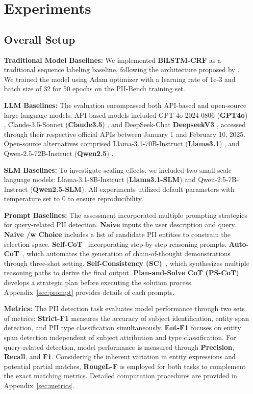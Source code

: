 \section{Experiments}
\subsection{Overall Setup}
\noindent\textbf{Traditional Model Baselines:}
We implemented \textbf{BiLSTM-CRF} as a traditional sequence labeling baseline, following the architecture proposed by \citet{huang2015bidirectional}. We trained the model using Adam optimizer with a learning rate of 1e-3 and batch size of 32 for 50 epochs on the PII-Bench training set.

\noindent\textbf{LLM Baselines:}
The evaluation encompassed both API-based and open-source large language models.
API-based models included GPT-4o-2024-0806 (\textbf{GPT4o}) \citep{gpt-4o}, Claude-3.5-Sonnet (\textbf{Claude3.5}) \citep{claude}, and DeepSeek-Chat {\textbf{DeepseekV3}} \citep{deepseek}, accessed through their respective official APIs between January 1 and February 10, 2025.
Open-source alternatives comprised Llama-3.1-70B-Instruct (\textbf{Llama3.1}) \citep{dubey2024llama}, and Qwen-2.5-72B-Instruct (\textbf{Qwen2.5}) \citep{qwen25}.

\noindent\textbf{SLM Baselines:}
To investigate scaling effects, we included two small-scale language models: Llama-3.1-8B-Instruct (\textbf{Llama3.1-SLM}) and Qwen-2.5-7B-Instruct (\textbf{Qwen2.5-SLM}).
All experiments utilized default parameters with temperature set to 0 to ensure reproducibility.


\noindent\textbf{Prompt Baselines:}
The assessment incorporated multiple prompting strategies for query-related PII detection. \textbf{Naive} inputs the user description and query. 
\textbf{Naive /w Choice} includes a list of candidate PII entities to constrain the selection space.
\textbf{Self-CoT}~\citep{wei2022chain} incorporating step-by-step reasoning prompts. 
\textbf{Auto-CoT}~\cite{autocot}, which automates the generation of chain-of-thought demonstrations through three-shot setting. 
\textbf{Self-Consistency (SC)}~\cite{sc}, which  synthesizes multiple reasoning paths to derive the final output. 
\textbf{Plan-and-Solve CoT (PS-CoT})~\cite{wang2023plan} develops a strategic plan before executing the solution process. 
Appendix~\ref{sec:prompt} provides details of each prompts.

\noindent\textbf{Metrics:}
The PII detection task evaluates model performance through two sets of metrics: 
\textbf{Strict-F1} measures the accuracy of subject identification, entity span detection, and PII type classification simultaneously.
\textbf{Ent-F1} focuses on entity span detection independent of subject attribution and type classification. 
For query-related detection, model performance is measured through \textbf{Precision}, \textbf{Recall}, and \textbf{F1}. 
Considering the inherent variation in entity expressions and potential partial matches, \textbf{RougeL-F} is employed for both tasks to complement the exact matching metrics. 
Detailed computation procedures are provided in Appendix~\ref{sec:metrics}.

